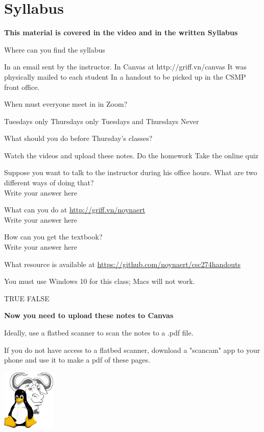 \documentclass[letterpaper,12pt]{exam}
\begin{document}
\section*{Syllabus}
\begin{center}
	\textbf{This material is covered in the video and in the written Syllabus}
\end{center}
\begin{questions}
	\question Where can you find the syllabus
	\begin{checkboxes}
	\choice In an email sent by the instructor.
	\choice In Canvas at http://griff.vn/canvas
	\choice It was physically mailed to each student
	\choice In a handout to be picked up in the CSMP front office.
	\end{checkboxes}

	\question When must everyone meet in in Zoom?
	\begin{checkboxes}
	\choice Tuesdays only
	\choice Thursdays only
	\choice Tuesdays and Thursdays
	\choice Never
	\end{checkboxes}

	\question What should you do before Thursday's classes?
	\begin{checkboxes}
	\choice Watch the videos and upload these notes.
	\choice Do the homework
	\choice Take the online quiz
	\end{checkboxes}

	\question Suppose you want to talk to the instructor during his office hours.  What are two different ways of doing that?
	\\{\color{blue} Write your answer here }
	\vspace{1.5cm}

	\question What can you do at \url{http://griff.vn/noynaert }
	\\{\color{blue} Write your answer here }
	\vspace{1.5cm}

	\question How can you get the textbook? 
	\\{\color{blue} Write your answer here }
	\vspace{1.5cm}

	\question What resource is available at  \url{https://github.com/noynaert/csc274handouts}
	\vspace{1.5cm}

	\question You must use Windows 10 for this class; Macs will not work.
	\begin{checkboxes}
	\choice TRUE
	\choice FALSE

	\end{checkboxes}
\end{questions}
\vspace{1cm}
\begin{center}
	\textbf{Now you need to upload these notes to Canvas}

	Ideally, use a flatbed scanner to scan the notes to a .pdf file.

	If you do not have access to a flatbed scanner, download a "scancam" app to your phone and use it to make a pdf of these pages.
\end{center}
\vspace{1cm}

\includegraphics[width=1in]{tux}\label{end}
\end{document}
